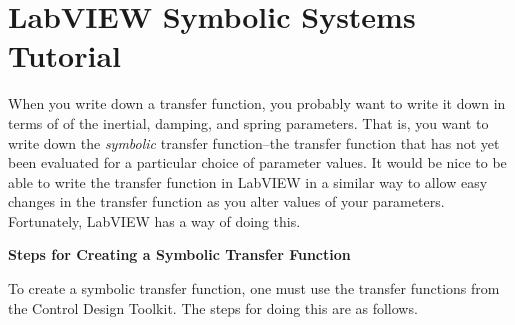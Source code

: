 \section{LabVIEW Symbolic Systems Tutorial}  


When you write down a transfer function, you probably want to write it down in
terms of of the inertial, damping, and spring parameters.  That is, you want to
write down the \emph{symbolic} transfer function--the transfer function that has
not yet been evaluated for a particular choice of parameter values.  It would be
nice to be able to write the transfer function in LabVIEW in a similar way to
allow easy changes in the transfer function as you alter values of your
parameters.  Fortunately, LabVIEW has a way of doing this.

\begin{center} \textbf{Steps for Creating a Symbolic Transfer Function}
\end{center}
To create a symbolic transfer function, one must use the transfer functions from
the Control Design Toolkit.  The steps for doing this are as follows.
